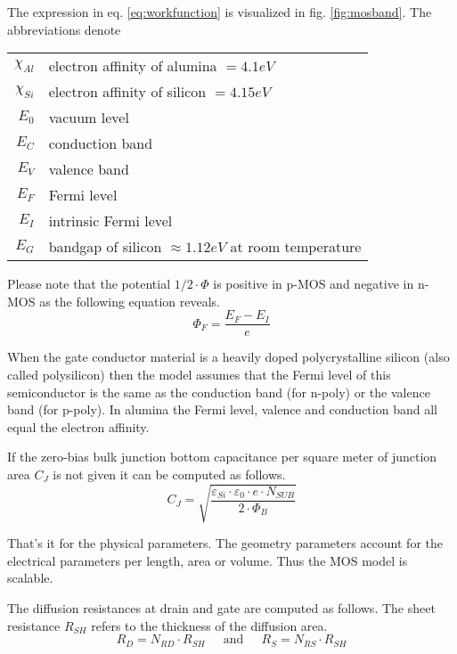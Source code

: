 The expression in eq. \eqref{eq:workfunction} is visualized in
fig. \ref{fig:mosband}.  The abbreviations denote

\addvspace{12pt}

\begin{tabular}{rl}
$\chi_{Al}$ & electron affinity of alumina $= 4.1eV$\\
$\chi_{Si}$ & electron affinity of silicon $= 4.15eV$\\
$E_0$ & vacuum level\\
$E_C$ & conduction band\\
$E_V$ & valence band\\
$E_F$ & Fermi level\\
$E_I$ & intrinsic Fermi level\\
$E_G$ & bandgap of silicon $\approx 1.12eV$ at room temperature\\
\end{tabular}

\addvspace{12pt}

Please note that the potential $1/2\cdot \Phi$ is positive in p-MOS
and negative in n-MOS as the following equation reveals.
\begin{equation}
\Phi_F = \dfrac{E_F - E_I}{e}
\end{equation}

When the gate conductor material is a heavily doped polycrystalline
silicon (also called polysilicon) then the model assumes that the
Fermi level of this semiconductor is the same as the conduction band
(for n-poly) or the valence band (for p-poly).  In alumina the Fermi
level, valence and conduction band all equal the electron affinity.

\addvspace{12pt}

If the zero-bias bulk junction bottom capacitance per square meter of
junction area $C_J$ is not given it can be computed as follows.
\begin{equation}
C_J = \sqrt{\dfrac{\varepsilon_{Si}\cdot \varepsilon_{0}\cdot e\cdot N_{SUB}}{2\cdot \Phi_B}}
\end{equation}

That's it for the physical parameters.  The geometry parameters
account for the electrical parameters per length, area or volume.
Thus the MOS model is scalable.

\addvspace{12pt}

The diffusion resistances at drain and gate are computed as follows.
The sheet resistance $R_{SH}$ refers to the thickness of the diffusion
area.
\begin{equation}
R_D = N_{RD}\cdot R_{SH}
\;\;\;\; \textrm{ and } \;\;\;\;
R_S = N_{RS}\cdot R_{SH}
\end{equation}

